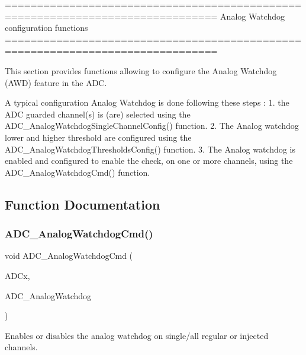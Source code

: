 \begin{DoxyVerb} ===============================================================================
                    Analog Watchdog configuration functions
 ===============================================================================  

  This section provides functions allowing to configure the Analog Watchdog
  (AWD) feature in the ADC.
  
  A typical configuration Analog Watchdog is done following these steps :
   1. the ADC guarded channel(s) is (are) selected using the 
      ADC_AnalogWatchdogSingleChannelConfig() function.
   2. The Analog watchdog lower and higher threshold are configured using the  
     ADC_AnalogWatchdogThresholdsConfig() function.
   3. The Analog watchdog is enabled and configured to enable the check, on one
      or more channels, using the  ADC_AnalogWatchdogCmd() function.\end{DoxyVerb}
 

\subsection{Function Documentation}
\mbox{\label{group__ADC__Group2_gad017d69bec6e497afd35ba25ea22d86e}} 
\subsubsection{A\+D\+C\+\_\+\+Analog\+Watchdog\+Cmd()}
{\footnotesize\ttfamily void A\+D\+C\+\_\+\+Analog\+Watchdog\+Cmd (\begin{DoxyParamCaption}\item[{\textbf{ A\+D\+C\+\_\+\+Type\+Def} $\ast$}]{A\+D\+Cx,  }\item[{uint32\+\_\+t}]{A\+D\+C\+\_\+\+Analog\+Watchdog }\end{DoxyParamCaption})}



Enables or disables the analog watchdog on single/all regular or injected channels. 


